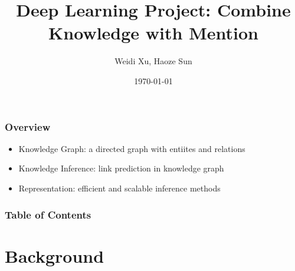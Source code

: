 \documentclass[pdf,10pt]{beamer}
\begin{document}
\title{Deep Learning Project: Combine Knowledge with Mention}
\subtitle{}
\author{Weidi Xu, Haoze Sun}
\date{\today}
\frame{\titlepage}


\begin{frame}
	\frametitle{Overview}
	\begin{itemize}
		\item Knowledge Graph: a directed graph with entiites and relations
		\item Knowledge Inference: link prediction in knowledge graph
		\item Representation: efficient and scalable inference methods
	\end{itemize}
\end{frame}

\begin{frame}
\frametitle{Table of Contents}
\tableofcontents
\end{frame}



\section{Background}
\end{document}
